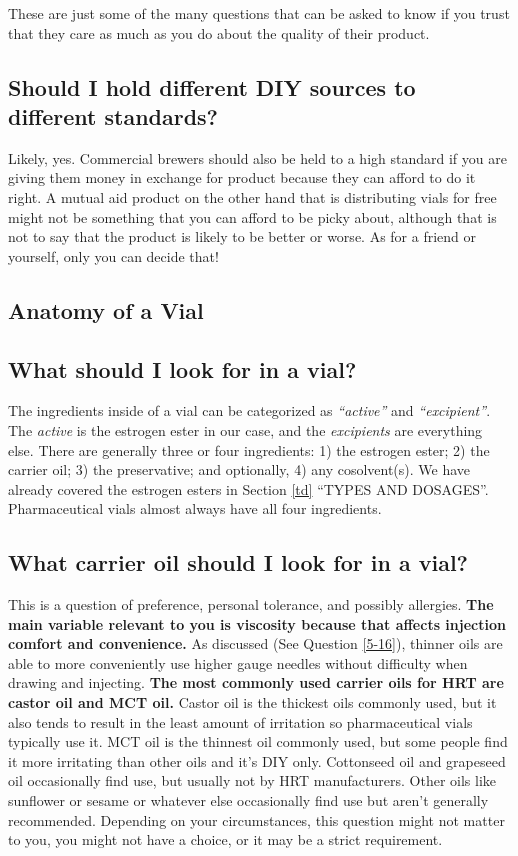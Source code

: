 \documentclass{article}
\begin{document}
These are just some of the many questions that can be asked to know if you trust that they care as much as you do about the quality of their product.

\subsection{Should I hold different DIY sources to different standards?}

Likely, yes. Commercial brewers should also be held to a high standard if you are giving them money in exchange for product because they can afford to do it right. A mutual aid product on the other hand that is distributing vials for free might not be something that you can afford to be picky about, although that is not to say that the product is likely to be better or worse. As for a friend or yourself, only you can decide that!

\subsection*{Anatomy of a Vial}

\subsection{What should I look for in a vial?}

The ingredients inside of a vial can be categorized as \textit{“active”} and \textit{“excipient”}. The\textit{ active} is the estrogen ester in our case, and the \textit{excipients} are everything else. There are generally three or four ingredients: 1) the estrogen ester; 2) the carrier oil; 3) the preservative; and optionally, 4) any cosolvent(s). We have already covered the estrogen esters in Section \ref{td} “TYPES AND DOSAGES”. Pharmaceutical vials almost always have all four ingredients.

\subsection{What carrier oil should I look for in a vial?}\label{6-16}

This is a question of preference, personal tolerance, and possibly allergies. \textbf{The main variable relevant to you is viscosity because that affects injection comfort and convenience.} As discussed (See Question \ref{5-16}), thinner oils are able to more conveniently use higher gauge needles without difficulty when drawing and injecting. \textbf{The most commonly used carrier oils for HRT are castor oil and MCT oil. }Castor oil is the thickest oils commonly used, but it also tends to result in the least amount of irritation so pharmaceutical vials typically use it. MCT oil is the thinnest oil commonly used, but some people find it more irritating than other oils and it’s DIY only. Cottonseed oil and grapeseed oil occasionally find use, but usually not by HRT manufacturers. Other oils like sunflower or sesame or whatever else occasionally find use but aren’t generally recommended. Depending on your circumstances, this question might not matter to you, you might not have a choice, or it may be a strict requirement. 
\end{document}
